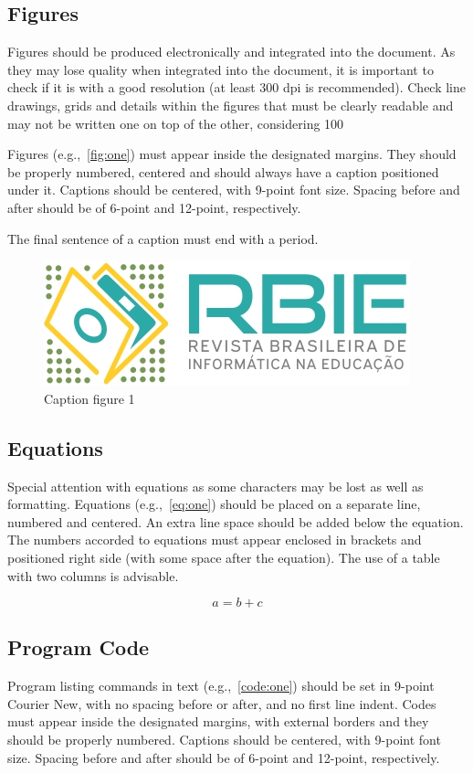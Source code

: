 \documentclass[english,brazilian]{RBIEarticle} %
\begin{document}
\subsection{Figures}
Figures should be produced electronically and integrated into the document. As they may lose quality when integrated into the document, it is important to check if it is with a good resolution (at least 300 dpi is recommended). Check line drawings, grids and details within the figures that must be clearly readable and may not be written one on top of the other, considering 100%

Figures (e.g.,~\autoref{fig:one}) must appear inside the designated margins. They should be properly numbered, centered and should always have a caption positioned under it. Captions should be centered, with 9-point font size. Spacing before and after should be of 6-point and 12-point, respectively.

The final sentence of a caption must end with a period. 

\begin{figure}[h]
	\centerline{\includegraphics[scale=0.25]{newlogo.png}}
	\caption{Caption figure 1}
	\label{fig:one}
\end{figure}


\subsection{Equations}
Special attention with equations as some characters may be lost as well as formatting. Equations (e.g.,~\autoref{eq:one}) should be placed on a separate line, numbered and centered. An extra line space should be added below the equation. The numbers accorded to equations must appear enclosed in brackets and positioned right side (with some space after the equation).
The use of a table with two columns is advisable.

\begin{equation}
	a = b + c
	\label{eq:one}
\end{equation}


\subsection{Program Code}
Program listing commands in text (e.g.,~\autoref{code:one}) should be set in 9-point Courier New, with no spacing before or after, and no first line indent. Codes must appear inside the designated margins, with external borders and they should be properly numbered. Captions should be centered, with 9-point font size. Spacing before and after should be of 6-point and 12-point, respectively.
\end{document}
